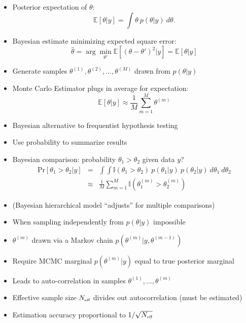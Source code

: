 \documentclass[10pt]{report}
\newcommand{\sld}[1]{\newpage{\noindent\LARGE \ \ \
    \textcolor{MidnightBlue}{\bfseries #1}}\vspace*{4pt}}
\begin{document}
\sld{Monte Carlo Example}
\begin{itemize}
\item Posterior expectation of $\theta$:
\[
\mathbb{E}[\theta|y] = \int \theta \ p(\theta|y) \ d\theta.
\]
\item Bayesian estimate minimizing expected square error: 
\[
\hat{\theta} 
= \arg\min_{\theta'}
\mathbb{E}[(\theta - \theta')^2|y]
= \mathbb{E}[\theta|y] 
\]
\item Generate samples $\theta^{(1)}, \theta^{(2)}, \ldots,
 \theta^{(M)}$ drawn from $p(\theta|y)$
\item Monte Carlo Estimator plugs in average for expectation:
\[
\mathbb{E}[\theta|y] \approx \frac{1}{M} \sum_{m=1}^M \theta^{(m)}
\]
\end{itemize}

\sld{Monte Carlo Example II}
\begin{itemize}
\item Bayesian alternative to frequentist hypothesis testing
\item Use probability to summarize results
\item Bayesian comparison: probability $\theta_1 > \theta_2$ given
  data $y$?
\begin{eqnarray*}
\mbox{Pr}[\theta_1 > \theta_2|y] 
& = & 
\int \int 
\mathbb{I}(\theta_1 > \theta_2) \ p(\theta_1|y) \ p(\theta_2|y)  
\ d\theta_1 \ d\theta_2
\\
& \approx & 
\frac{1}{M} \sum_{m=1}^M \mathbb{I}(\theta_1^{(m)} > \theta_2^{(m)})
\end{eqnarray*}
%
\item (Bayesian hierarchical model ``adjusts'' for multiple comparisons)
\end{itemize}

\sld{Markov Chain Monte Carlo}
\begin{itemize}
\item When sampling independently from $p(\theta|y)$ impossible
\item $\theta^{(m)}$ drawn via a Markov chain $p(\theta^{(m)}|y,\theta^{(m-1)})$
\item Require MCMC marginal $p(\theta^{(m)}|y)$ equal to true
  posterior marginal
\item Leads to auto-correlation in samples
  $\theta^{(1)},\ldots, \theta^{(m)}$
\item Effective sample size $N_{\mbox{\tiny eff}}$ divides out
  autocorrelation (must be estimated)
\item Estimation accuracy proportional to $1 / \sqrt{N_{\mbox{\tiny eff}}}$
\end{itemize}
\end{document}
